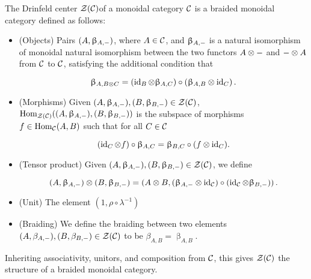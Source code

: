 \begin{prop} The Drinfeld center ${\mathcal Z}({\mathcal C})$of a monoidal category ${\mathcal C}$ is a braided monoidal category defined as follows:

\begin{itemize}
\item (Objects) Pairs $(A,\upbeta_{A,\--})$, where $A\in {\mathcal C}$, and $\upbeta_{A,\--}$ is a natural isomorphism of monoidal natural isomorphism between the two functors $A\otimes \--$ and $\--\otimes A$ from ${\mathcal C}$ to ${\mathcal C}$, satisfying the additional condition that

$$\upbeta_{A,B\otimes C}=\left(\operatorname{id}_{B}\otimes \upbeta_{A,C}\right)\circ \left(\upbeta_{A,B}\otimes \operatorname{id}_C\right).$$

\item (Morphisms) Given $(A,\upbeta_{A,\--}), (B,\upbeta_{B,\--})\in {\mathcal Z}({\mathcal C})$, $\operatorname{Hom}_{{\mathcal Z}({\mathcal C})}((A,\upbeta_{A,\--}),(B,\upbeta_{B,\--}))$ is the subspace of morphisms $f\in \operatorname{Hom}_{{\mathcal C}}(A,B)$ such that for all $C\in {\mathcal C}$

$$\left(\operatorname{id}_{C}\otimes f\right)\circ \upbeta_{A,C}=\upbeta_{B,C}\circ (f\otimes \operatorname{id}_C).$$

\item (Tensor product) Given $(A,\upbeta_{A,\--}), (B,\upbeta_{B,\--})\in {\mathcal Z}({\mathcal C})$, we define

$$(A,\upbeta_{A,\--})\otimes (B,\upbeta_{B,\--})=\left(A\otimes B, (\upbeta_{A,\--}\otimes \operatorname{id}_{{\mathcal C}})\circ (\operatorname{id}_{{\mathcal C}}\otimes \upbeta_{B,\--}) \right).$$

\item (Unit) The element $(1,\rho\circ \lambda^{-1})$

\item (Braiding) We define the braiding between two elements $(A,\beta_{A,\--}), (B,\beta_{B,\--})\in {\mathcal Z}({\mathcal C})$ to be $\beta_{A,B}=\upbeta_{A,B}$.
\end{itemize}

Inheriting associativity, unitors, and composition from ${\mathcal C}$, this gives ${\mathcal Z}({\mathcal C})$ the structure of a braided monoidal category.
\end{prop}
